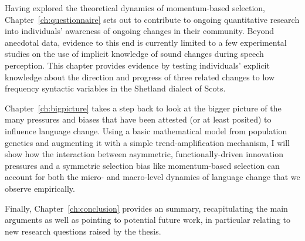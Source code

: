 Having explored the theoretical dynamics of momentum-based selection, Chapter~\ref{ch:questionnaire} sets out to contribute to ongoing quantitative research into individuals' awareness of ongoing changes in their community. Beyond anecdotal data, evidence to this end is currently limited to a few experimental studies on the use of implicit knowledge of sound changes during speech perception. This chapter provides evidence by testing individuals' explicit knowledge about the direction and progress of three related changes to low frequency syntactic variables in the Shetland dialect of Scots.

Chapter~\ref{ch:bigpicture} takes a step back to look at the bigger picture of the many pressures and biases that have been attested (or at least posited) to influence language change. Using a basic mathematical model from population genetics and augmenting it with a simple trend-amplification mechanism, I will show how the interaction between asymmetric, functionally-driven innovation pressures and a symmetric selection bias like momentum-based selection can account for both the micro- and macro-level dynamics of language change that we observe empirically.

Finally, Chapter~\ref{ch:conclusion} provides an summary, recapitulating the main arguments as well as pointing to potential future work, in particular relating to new research questions raised by the thesis.
